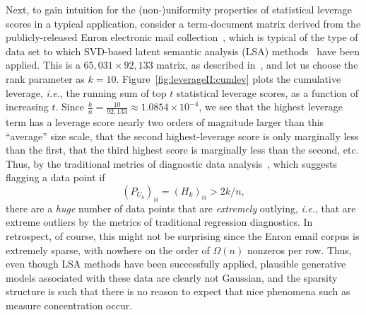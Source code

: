 \documentclass[twoside]{article}
\begin{document}
Next, to gain intuition for the (non-)uniformity properties of statistical 
leverage scores in a typical application, consider a term-document matrix 
derived from the publicly-released 
Enron electronic mail collection~\cite{BB06}, which is typical of the type 
of data set to which SVD-based latent semantic analysis (LSA) 
methods~\cite{DDLFH90} have been applied.
This is a $65,031 \times 92,133$ matrix, as described in~\cite{BB06}, 
and let us choose the rank parameter as $k=10$.
Figure~\ref{fig:leverageII:cumlev} plots the cumulative leverage, \emph{i.e.}, 
the running sum of top $t$ statistical leverage scores, as a function of 
increasing $t$.
Since $\frac{k}{n}=\frac{10}{92,133}\approx1.0854\times10^{-4}$, we see that 
the highest leverage term has a leverage score nearly two orders of 
magnitude larger than this ``average'' size scale, that the second 
highest-leverage score is only marginally less than the first, that the 
third highest score is marginally less than the second, etc.
Thus, by the traditional metrics of diagnostic data 
analysis~\cite{VW81,ChatterjeeHadiPrice00}, which suggests flagging a data 
point if 
$$ (P_{U_k})_{ii} = (H_k)_{ii}> 2k/n ,$$
there are a \emph{huge} number of data points that are \emph{extremely} 
outlying, \emph{i.e.}, that are extreme outliers by the metrics of 
traditional regression diagnostics.
In retrospect, of course, this might not be surprising since the Enron email 
corpus is extremely sparse, with nowhere on the order of $\Omega(n)$ 
nonzeros per row.
Thus, even though LSA methods have been successfully applied, plausible 
generative models associated with these data are clearly not Gaussian, and 
the sparsity structure is such that there is no reason to expect that nice 
phenomena such as measure concentration occur.
\end{document}
